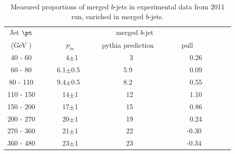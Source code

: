 \begin{table}[!hbt] %
\renewcommand{\arraystretch}{1.2}
\centering
\begin{tabular}{ | c || c | c | c ||}
  \hline
  Jet $\pt$ & \multicolumn{3}{c||}{merged $b$-jet}\\ \cline{2-4}
    (GeV ) & ~~~~~~~$p_m$~~~~~~ & pythia prediction & ~~~~~~pull~~~~~~~~~~\\ \hline
   40 - 60 &  ~~4$\pm$1  &    ~~3  &  ~0.26  \\  
   60 - 80 &  6.1$\pm$0.5  &  5.9  &  ~0.09  \\ 
   80 - 110&  9.4$\pm$0.5  &  8.2  &  ~0.55  \\ 
  110 - 150&  ~14$\pm$1    &  ~12  &  ~1.10  \\ 
  150 - 200&  ~17$\pm$1    &  ~15  &  ~0.86  \\ 
  200 - 270&  ~20$\pm$1    &  ~19  &  ~0.24  \\ 
  270 - 360&  ~21$\pm$1    &  ~22  &  -0.30  \\ 
  360 - 480&  ~23$\pm$1    &  ~23  &  -0.34  \\ \hline
\end{tabular}
\caption{Measured proportions of merged $b$-jets in experimental data from 2011 run, enriched in merged $b$-jets.}
\label{tb:fitfractions2btagM}
\end{table}


